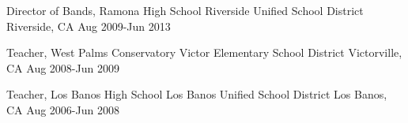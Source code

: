 \begin{cventries}
  \cventry
    {Director of Bands, Ramona High School} %
    {Riverside Unified School District} %
    {Riverside, CA} %
    {Aug 2009-Jun 2013} %
    {}

  \cventry
    {Teacher, West Palms Conservatory} %
    {Victor Elementary School District} %
    {Victorville, CA} %
    {Aug 2008-Jun 2009} %
    {}


  \cventry
    {Teacher, Los Banos High School} %
    {Los Banos Unified School District} %
    {Los Banos, CA} %
    {Aug 2006-Jun 2008} %
    {}


\end{cventries}

